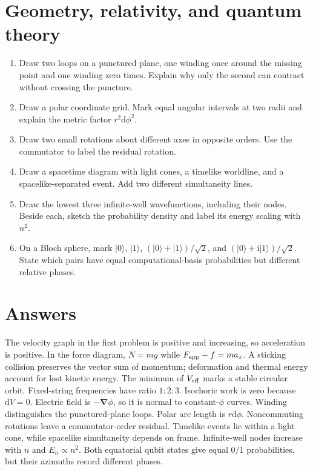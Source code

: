 \documentclass[11pt,oneside]{book}
\newcommand{\dd}{\mathrm{d}}
\newcommand{\ii}{\mathrm{i}}
\newcommand{\grad}{\boldsymbol{\nabla}}
\newcommand{\ket}[1]{\lvert #1\rangle}
\theoremstyle{reviewstyle}
\begin{document}
\section{Geometry, relativity, and quantum theory}
\begin{enumerate}
\item Draw two loops on a punctured plane, one winding once around the missing point and one winding zero times. Explain why only the second can contract without crossing the puncture.
\item Draw a polar coordinate grid. Mark equal angular intervals at two radii and explain the metric factor $r^2\dd\phi^2$.
\item Draw two small rotations about different axes in opposite orders. Use the commutator to label the residual rotation.
\item Draw a spacetime diagram with light cones, a timelike worldline, and a spacelike-separated event. Add two different simultaneity lines.
\item Draw the lowest three infinite-well wavefunctions, including their nodes. Beside each, sketch the probability density and label its energy scaling with $n^2$.
\item On a Bloch sphere, mark $\ket0$, $\ket1$, $(\ket0+\ket1)/\sqrt2$, and $(\ket0+\ii\ket1)/\sqrt2$. State which pairs have equal computational-basis probabilities but different relative phases.
\end{enumerate}

\section*{Answers}
The velocity graph in the first problem is positive and increasing, so acceleration is positive. In the force diagram, $N=mg$ while $F_{\rm app}-f=ma_x$. A sticking collision preserves the vector sum of momentum; deformation and thermal energy account for lost kinetic energy. The minimum of $V_{\rm eff}$ marks a stable circular orbit. Fixed-string frequencies have ratio $1:2:3$. Isochoric work is zero because $\dd V=0$. Electric field is $-\grad\phi$, so it is normal to constant-$\phi$ curves. Winding distinguishes the punctured-plane loops. Polar arc length is $r\dd\phi$. Noncommuting rotations leave a commutator-order residual. Timelike events lie within a light cone, while spacelike simultaneity depends on frame. Infinite-well nodes increase with $n$ and $E_n\propto n^2$. Both equatorial qubit states give equal $0/1$ probabilities, but their azimuths record different phases.
\end{document}
